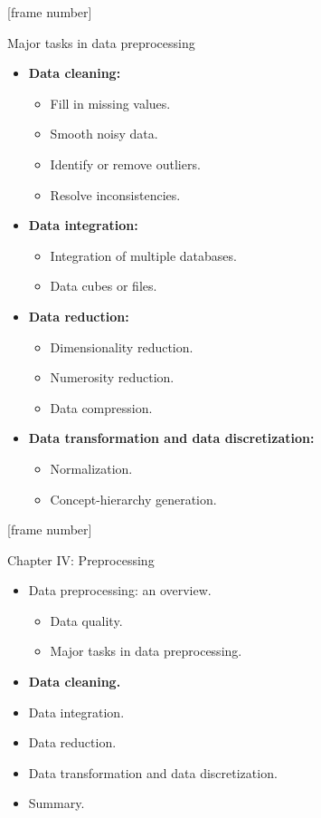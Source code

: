 \documentclass[aspectratio=169,t]{beamer}
\begin{document}
  {
    [frame number]
    \begin{frame}{Major tasks in data preprocessing}
      \begin{itemize}
        \item \textbf{Data cleaning:}
        \begin{itemize}
          \item Fill in missing values.
          \item Smooth noisy data.
          \item Identify or remove outliers.
          \item Resolve inconsistencies.
        \end{itemize}
        \item \textbf{Data integration:}
        \begin{itemize}
          \item Integration of multiple databases.
          \item Data cubes or files.
        \end{itemize}
        \item \textbf{Data reduction:}
        \begin{itemize}
          \item Dimensionality reduction.
          \item Numerosity reduction.
          \item Data compression.
        \end{itemize}
        \item \textbf{Data transformation and data discretization:}
        \begin{itemize}
          \item Normalization.
          \item Concept-hierarchy generation.
        \end{itemize}
      \end{itemize}
    \end{frame}
  }

  {
    [frame number]
    \begin{frame}{Chapter IV: Preprocessing}
        \begin{itemize}
            \item Data preprocessing: an overview.
            \begin{itemize}
              \item Data quality.
              \item Major tasks in data preprocessing.
            \end{itemize}
            \item \textbf{Data cleaning.}
            \item Data integration.
            \item Data reduction.
            \item Data transformation and data discretization.
            \item Summary.
        \end{itemize}
    \end{frame}
  }
\end{document}
